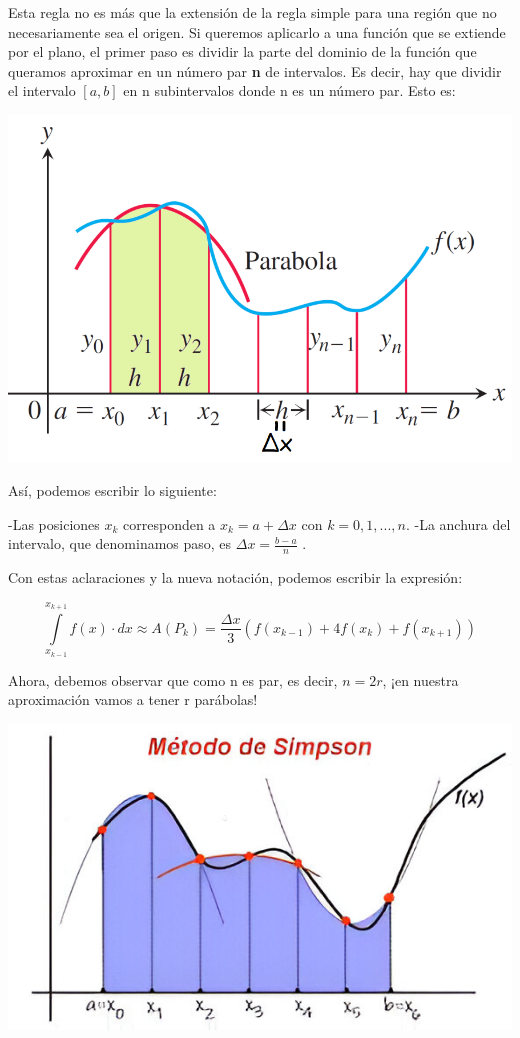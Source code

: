 \documentclass[12pt]{article}
\begin{document}
Esta regla no es más que la extensión de la regla simple para una región que no necesariamente sea el origen. Si queremos aplicarlo a una función que se extiende por el plano, el primer paso es dividir la parte del dominio de la función que queramos aproximar en un número par \textbf{n} de intervalos. Es decir, hay que dividir el intervalo $[a,b]$ en n subintervalos donde n es un número par. Esto es:

\begin{center}
\includegraphics[width=0.6\linewidth]{simple_n}
\end{center}

Así, podemos escribir lo siguiente:

\begin{flushleft}
-Las posiciones $x_k$ corresponden a $x_k=a+\Delta x$ con $k=0,1,...,n$.\newline
-La anchura del intervalo, que denominamos paso, es $\Delta x=\frac{b-a}{n}$ .
\end{flushleft}

Con estas aclaraciones y la nueva notación, podemos escribir la expresión:

\begin{equation}
\int \limits_{x_{k-1}}^{x_{k+1}} f(x) \cdot dx \approx 
A(P_k) =
\frac{\Delta x}{3}(f(x_{k-1})+4f(x_k)+f(x_{k+1}))
\end{equation}

Ahora, debemos observar que como n es par, es decir, $n=2r$, ¡en nuestra aproximación vamos a tener r parábolas!\\

\begin{center}
\includegraphics[width=0.6\linewidth]{fotos/rpara.jpeg}
\end{center}
\end{document}

